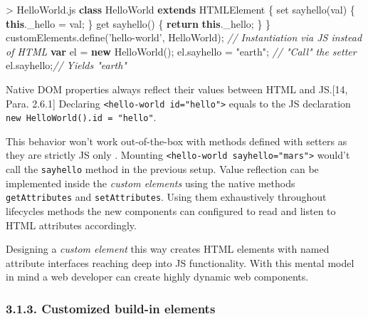 \documentclass[]{article}
\newenvironment{Shaded}{}{}
\newcommand{\KeywordTok}[1]{\textcolor[rgb]{0.00,0.44,0.13}{\textbf{{#1}}}}
\newcommand{\StringTok}[1]{\textcolor[rgb]{0.25,0.44,0.63}{{#1}}}
\newcommand{\CommentTok}[1]{\textcolor[rgb]{0.38,0.63,0.69}{\textit{{#1}}}}
\newcommand{\VariableTok}[1]{\textcolor[rgb]{0.10,0.09,0.49}{{#1}}}
\newcommand{\ControlFlowTok}[1]{\textcolor[rgb]{0.00,0.44,0.13}{\textbf{{#1}}}}
\newcommand{\OperatorTok}[1]{\textcolor[rgb]{0.40,0.40,0.40}{{#1}}}
\newcommand{\AttributeTok}[1]{\textcolor[rgb]{0.49,0.56,0.16}{{#1}}}
\newcommand{\NormalTok}[1]{{#1}}
\begin{document}
\begin{Shaded}
\begin{Highlighting}[]
\OperatorTok{>} \VariableTok{HelloWorld}\NormalTok{.}\AttributeTok{js}
\KeywordTok{class} \NormalTok{HelloWorld }\KeywordTok{extends} \NormalTok{HTMLElement }\OperatorTok{\{}
  \NormalTok{set }\AttributeTok{sayhello}\NormalTok{(val) }\OperatorTok{\{}
    \KeywordTok{this}\NormalTok{.}\AttributeTok{_hello} \OperatorTok{=} \NormalTok{val}\OperatorTok{;}
  \OperatorTok{\}}
  \NormalTok{get }\AttributeTok{sayhello}\NormalTok{() }\OperatorTok{\{}
    \ControlFlowTok{return} \KeywordTok{this}\NormalTok{.}\AttributeTok{_hello}\OperatorTok{;}
  \OperatorTok{\}}
\OperatorTok{\}}
\VariableTok{customElements}\NormalTok{.}\AttributeTok{define}\NormalTok{(}\StringTok{'hello-world'}\OperatorTok{,} \NormalTok{HelloWorld)}\OperatorTok{;}
\CommentTok{// Instantiation via JS instead of HTML}
\KeywordTok{var} \NormalTok{el }\OperatorTok{=} \KeywordTok{new} \AttributeTok{HelloWorld}\NormalTok{()}\OperatorTok{;}
\VariableTok{el}\NormalTok{.}\AttributeTok{sayhello} \OperatorTok{=} \StringTok{"earth"}\OperatorTok{;} \CommentTok{// "Call" the setter}
\VariableTok{el}\NormalTok{.}\AttributeTok{sayhello}\OperatorTok{;}\CommentTok{// Yields "earth"}
\end{Highlighting}
\end{Shaded}

Native DOM properties always reflect their values between HTML and
JS.{[}14, Para. 2.6.1{]} Declaring
\texttt{\textless{}hello-world\ id="hello"\textgreater{}} equals to the
JS declaration \texttt{new\ HelloWorld().id\ =\ "hello"}.

This behavior won't work out-of-the-box with methods defined with
setters as they are strictly JS only . Mounting
\texttt{\textless{}hello-world\ sayhello="mars"\textgreater{}} would't
call the \texttt{sayhello} method in the previous setup. Value
reflection can be implemented inside the \emph{custom elements} using
the native methods \texttt{getAttributes} and \texttt{setAttributes}.
Using them exhaustively throughout lifecycles methods the new components
can configured to read and listen to HTML attributes accordingly.

Designing a \emph{custom element} this way creates HTML elements with
named attribute interfaces reaching deep into JS functionality. With
this mental model in mind a web developer can create highly dynamic web
components.

\subsubsection{3.1.3. Customized build-in
elements}\label{customized-build-in-elements}
\end{document}
